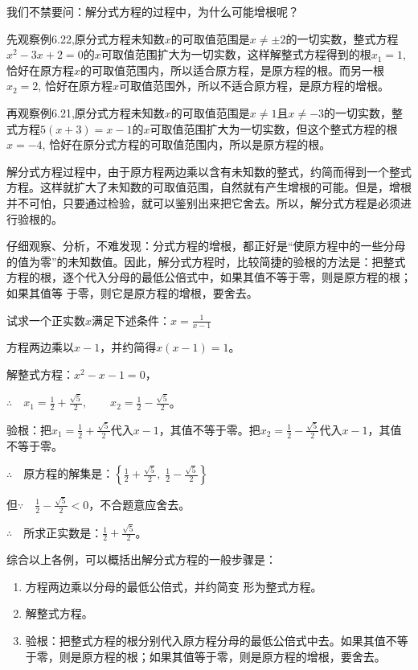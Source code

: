 我们不禁要问：解分式方程的过程中，为什么可能增根呢？

先观察例6.22,原分式方程未知数$x$的可取值范围是$x\ne \pm2$的一切实数，整式方程$x^2-3x+2=0$的$x$可取值范围扩大为一切实数，这样解整式方程得到的根$x_1=1$, 恰好在原方程$x$的可取值范围内，所以适合原方程，是原方程的根。而另一根$x_2=2$, 恰好在原方程$x$可取值范围外，所以不适合原方程，是原方程的增根。

再观察例6.21,原分式方程未知数$x$的可取值范围是$x\ne 1$且$x\ne -3$的一切实数，整式方程$5(x+3)=x-1$的$x$可取值范围扩大为一切实数，但这个整式方程的根$x=-4$, 恰好在原分式方程的可取值范围内，所以是原方程的根。

解分式方程过程中，由于原方程两边乘以含有未知数的整式，约简而得到一个整式方程。这样就扩大了未知数的可取值范围，自然就有产生增根的可能。但是，增根并不可怕，只要通过检验，就可以鉴别出来把它舍去。所以，解分式方程是必须进行验根的。

仔细观察、分析，不难发现：分式方程的增根，都正好是“使原方程中的一些分母的值为零”的未知数值。因此，解分式方程时，比较简捷的验根的方法是：把整式方程的根，逐个代入分母的最低公倍式中，如果其值不等于零，则是原方程的根；如果其值等
于零，则它是原方程的增根，要舍去。


\begin{example}
    试求一个正实数$x$满足下述条件：$x=\frac{1}{x-1}$
\end{example}

\begin{solution}
方程两边乘以$x-1$，并约简得$x(x-1)=1$。

解整式方程：$x^2-x-1=0$，

$\therefore\quad x_1=\frac{1}{2}+\frac{\sqrt{5}}{2},\qquad x_2=\frac{1}{2}-\frac{\sqrt{5}}{2}$。

验根：把$x_1=\frac{1}{2}+\frac{\sqrt{5}}{2}$代入$x-1$，其值不等于零。把$x_2=\frac{1}{2}-\frac{\sqrt{5}}{2}$代入$x-1$，其值不等于零。

$\therefore\quad $原方程的解集是：$\left\{\frac{1}{2}+\frac{\sqrt{5}}{2},\; \frac{1}{2}-\frac{\sqrt{5}}{2}\right\}$

但$\because\quad \frac{1}{2}-\frac{\sqrt{5}}{2}<0$，不合题意应舍去。

$\therefore\quad $所求正实数是：$\frac{1}{2}+\frac{\sqrt{5}}{2}$。
\end{solution}

综合以上各例，可以概括出解分式方程的一般步骤是：
\begin{enumerate}
    \item 方程两边乘以分母的最低公倍式，并约简变
形为整式方程。
\item 解整式方程。
\item 验根：把整式方程的根分别代入原方程分母的最低公倍式中去。如果其值不等于零，则是原方程的根；如果其值等于零，则是原方程的增根，要舍去。
\end{enumerate}

